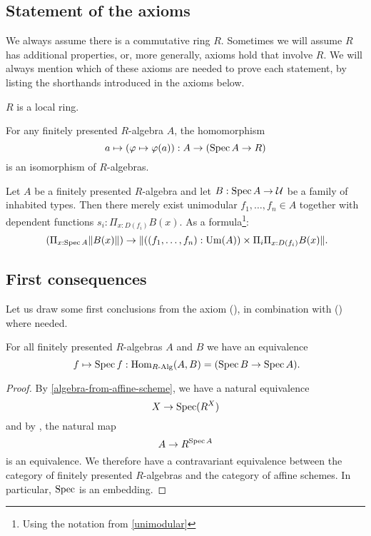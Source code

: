 \subsection{Statement of the axioms}
We always assume there is a commutative ring $R$.
Sometimes we will assume $R$ has additional properties, or, more generally,
axioms hold that involve $R$.
We will always mention which of these axioms are needed to prove each statement,
by listing the shorthands introduced in the axioms below.

\begin{axiom}[Loc]%
  \label{loc}
  $R$ is a local ring.
\end{axiom}

\begin{axiom}[SQC]%
  \label{sqc}
  For any finitely presented $R$-algebra $A$, the homomorphism
  \[ a \mapsto (\varphi\mapsto \varphi(a)) : A \to (\operatorname{Spec} A \to R)\]
  is an isomorphism of $R$-algebras.
\end{axiom}

\begin{axiom}[Z-choice]%
  \label{Z-choice}
  Let $A$ be a finitely presented $R$-algebra
  and let $B : \operatorname{Spec} A \to \mathcal{U}$ be a family of inhabited types.
  Then there merely exist unimodular $f_1, \dots, f_n \in A$
  together with dependent functions $s_i : \Pi_{x : D(f_i)} B(x)$.
  As a formula\footnote{Using the notation from \cref{unimodular}}:
  \[ (\Pi_{x : \Spec A} \propTrunc{B(x)}) \to
     \propTrunc{ ((f_1,\dots,f_n):\Um(A)) \times
      \Pi_i \Pi_{x : D(f_i)} B(x) }
     \rlap{.}
  \]
\end{axiom}

\subsection{First consequences}

Let us draw some first conclusions from the axiom (),
in combination with () where needed.

\begin{proposition}%
  \label{spec-embedding}
  For all finitely presented $R$-algebras $A$ and $B$ we have an equivalence
  \[
    f\mapsto \Spec f : \Hom_{\Alg{R}}(A,B) = (\Spec B \to \Spec A)
    \rlap{.}
  \]
\end{proposition}

\begin{proof}
  By \cref{algebra-from-affine-scheme}, we have a natural equivalence
  \[
    X\to \operatorname{Spec} (R^X)
  \]
  and by , the natural map
  \[
    A\to R^{\operatorname{Spec} A}
  \]
  is an equivalence.
  We therefore have a contravariant equivalence between
  the category of finitely presented $R$-algebras
  and the category of affine schemes.
  In particular, $\operatorname{Spec}$ is an embedding.
\end{proof}

